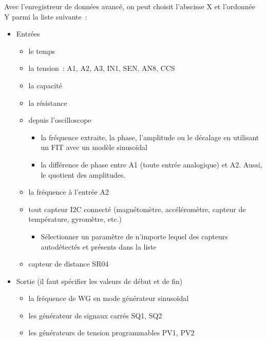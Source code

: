 \documentclass[a4paper,12pt,french]{sphinxmanual}
\begin{document}
Avec l’enregistreur de données avancé, on peut choisit l’abscisse X et l’ordonnée Y parmi la liste suivante :
\begin{itemize}
\item {} 
Entrées
\begin{itemize}
\item {} 
le temps

\item {} 
la tension : A1, A2, A3, IN1, SEN, AN8, CCS

\item {} 
la capacité

\item {} 
la résistance

\item {} 
depuis l’oscilloscope
\begin{itemize}
\item {} 
la fréquence extraite, la phase, l’amplitude ou le décalage en utilisant un FIT avec un modèle sinusoïdal

\item {} 
la différence de phase entre A1 (toute entrée analogique) et A2. Aussi, le quotient des amplitudes.

\end{itemize}

\item {} 
la fréquence à l’entrée A2

\item {} 
tout capteur I2C connecté (magnétomètre, accéléromètre, capteur de température, gyromètre, etc.)
\begin{itemize}
\item {} 
Sélectionner un paramètre de n’importe lequel des capteurs autodétectés et présents dans la liste

\end{itemize}

\item {} 
capteur de distance SR04

\end{itemize}

\item {} 
Sortie (il faut spécifier les valeurs de début et de fin)
\begin{itemize}
\item {} 
la fréquence de WG en mode générateur sinusoïdal

\item {} 
les générateur de signaux carrés SQ1, SQ2

\item {} 
les générateurs de tension programmables PV1, PV2

\end{itemize}

\end{itemize}
\end{document}
